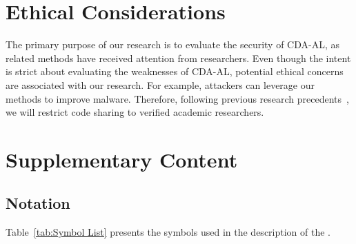 \section*{Ethical Considerations}
\label{Sec: Potential Ethical Concerns}
The primary purpose of our research is to evaluate the security of CDA-AL, as related methods have received attention from researchers. 
Even though the intent is strict about evaluating the weaknesses of CDA-AL, potential ethical concerns are associated with our research. 
For example, attackers can leverage our methods to improve malware. 
Therefore, following previous research precedents~\cite{2020-SP-Kerckhos-principle,2021-CCS-Evasion-Attack-Graph-Attack,2023-CCS-Query-Based-Evasion-Attack}, we will restrict code sharing to verified academic researchers.

\section{Supplementary Content}
\subsection{Notation}
\label{Sec:Notation}
Table~\ref{tab:Symbol List} presents the symbols used in the description of the \pandora.

